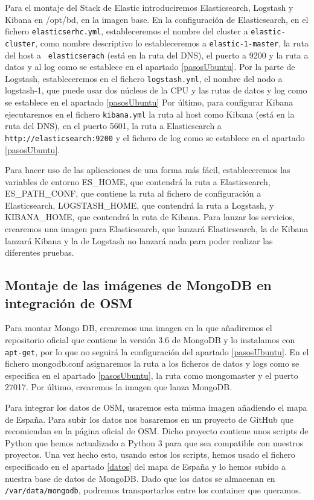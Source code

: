 Para el montaje del Stack de Elastic introduciremos Elasticsearch, Logstash
y Kibana en /opt/bd, en la imagen base. En la configuración de
Elasticsearch, en el fichero {\tt elasticserhc.yml}, estableceremos el
nombre del cluster a {\tt elastic-cluster}, como nombre descriptivo lo
estableceremos a {\tt elastic-1-master}, la ruta del host a {\tt
  elasticserach} (está en la ruta del DNS), el puerto a 9200 y la ruta a
datos y al log como se establece en el apartado \ref{pasosUbuntu}. Por la
parte de Logstash, estableceremos en el fichero {\tt logstash.yml}, el
nombre del nodo a logstash-1, que puede usar dos núcleos de la CPU y las
rutas de datos y log como se establece en el apartado \ref{pasosUbuntu} Por
último, para configurar Kibana ejecutaremos en el fichero {\tt kibana.yml}
la ruta al host como Kibana (está en la ruta del DNS), en el puerto 5601,
la ruta a Elasticsearch a {\tt http://elasticsearch:9200} y el fichero de
log como se establece en el apartado \ref{pasosUbuntu}.

Para hacer uso de las aplicaciones de una forma más fácil, estableceremos las variables de entorno ES\_HOME, que contendrá la ruta a Elasticsearch, ES\_PATH\_CONF, que contiene la ruta al fichero de configuración a Elasticsearch, LOGSTASH\_HOME, que contendrá la ruta a Logstash, y KIBANA\_HOME, que contendrá la ruta de Kibana.
Para lanzar los servicios, crearemos una imagen para Elasticsearch, que lanzará Elasticsearch, la de Kibana lanzará Kibana y la de Logstash no lanzará nada para poder realizar las diferentes pruebas.

\subsection{Montaje de las imágenes de MongoDB en integración de
  OSM\label{montMongo}}

Para montar Mongo DB, crearemos una imagen en la que añadiremos el
repositorio oficial que contiene la versión 3.6 de MongoDB y lo instalamos
con {\tt apt-get}, por lo que no seguirá la configuración del apartado
\ref{pasosUbuntu}. En el fichero mongodb.conf asignaremos la ruta a los
ficheros de datos y logs como se especifica en el apartado
\ref{pasosUbuntu}, la ruta como mongomaster y el puerto 27017. Por último,
crearemos la imagen que lanza MongoDB.

Para integrar los datos de OSM, usaremos esta misma imagen añadiendo el
mapa de España. Para subir los datos nos basaremos en un proyecto de GitHub
que recomiendan en la página oficial de OSM. Dicho proyecto contiene unos
scripts de Python que hemos actualizado a Python 3 para que sea compatible
con nuestros proyectos. Una vez hecho esto, usando estos los scripts, hemos
usado el fichero especificado en el apartado \ref{datos} del mapa de España
y lo hemos subido a nuestra base de datos de MongoDB. Dado que los datos se
almacenan en {\tt /var/data/mongodb}, podremos transportarlos entre los
container que queramos.

